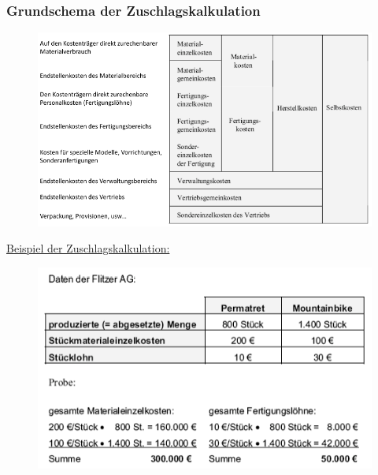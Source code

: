 \documentclass[a4paper,11pt, twoside]{article}
\begin{document}
\subsubsection*{Grundschema der Zuschlagskalkulation}

\begin{figure}[h]
 \begin{center}
   \includegraphics[scale=0.5]{bilder/grundschema_zuschlagskalkulation.png}
 \end{center}
\end{figure}

\underline{Beispiel der Zuschlagskalkulation:}

\begin{figure}[h]
 \begin{center}
   \includegraphics[scale=0.6]{bilder/beispiel_zuschlagskalkulation.png}
 \end{center}
\end{figure}
\end{document}
